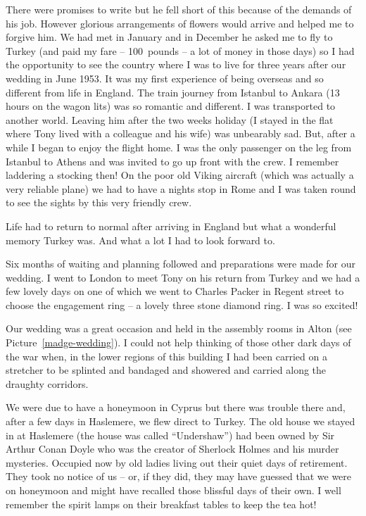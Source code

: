 There were promises to write but he fell short of this because of the
demands of his job. However glorious arrangements of flowers would
arrive and helped me to forgive him. We had met in January and in
December he asked me to fly to Turkey (and paid my fare -- 100~pounds
-- a lot of money in those days) so I had the opportunity to see the
country where I was to live for three years after our wedding in June
1953. It was my first experience of being overseas and so different
from life in England. The train journey from Istanbul to Ankara (13
hours on the wagon lits) was so romantic and different. I was
transported to another world. Leaving him after the two weeks holiday
(I stayed in the flat where Tony lived with a colleague and his wife)
was unbearably sad. But, after a while I began to enjoy the flight
home. I was the only passenger on the leg from Istanbul to Athens and
was invited to go up front with the crew. I remember laddering a
stocking then! On the poor old Viking aircraft (which was actually a
very reliable plane) we had to have a nights stop in Rome and I was
taken round to see the sights by this very friendly crew.

Life had to return to normal after arriving in England but what a
wonderful memory Turkey was. And what a lot I had to look forward to.

Six months of waiting and planning followed and preparations were made
for our wedding. I went to London to meet Tony on his return from
Turkey and we had a few lovely days on one of which we went to Charles
Packer in Regent street to choose the engagement ring -- a lovely
three stone diamond ring. I was so excited!

Our wedding was a great occasion and held in the assembly rooms in
Alton (see Picture~\ref{madge-wedding}). I could not help thinking of
those other dark days of the war when, in the lower regions of this
building I had been carried on a stretcher to be splinted and bandaged
and showered and carried along the draughty corridors.

We were due to have a honeymoon in Cyprus but there was trouble there
and, after a few days in Haslemere, we flew direct to Turkey. The old
house we stayed in at Haslemere (the house was called ``Undershaw'')
had been owned by Sir Arthur Conan Doyle who was the creator of
Sherlock Holmes and his murder mysteries. Occupied now by old ladies
living out their quiet days of retirement. They took no notice of us
-- or, if they did, they may have guessed that we were on honeymoon
and might have recalled those blissful days of their own. I well
remember the spirit lamps on their breakfast tables to keep the tea
hot!


